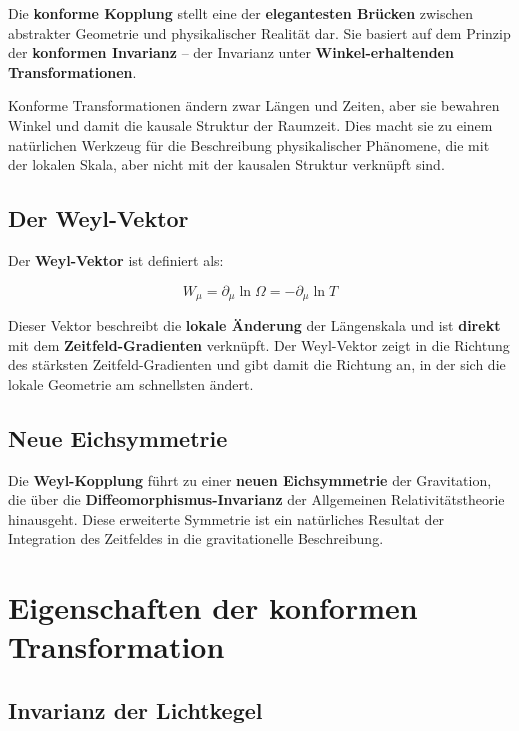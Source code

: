 \documentclass[12pt,a4paper]{report}
\begin{document}
	Die \textbf{konforme Kopplung} stellt eine der \textbf{elegantesten Brücken} zwischen abstrakter Geometrie und physikalischer Realität dar. Sie basiert auf dem Prinzip der \textbf{konformen Invarianz} -- der Invarianz unter \textbf{Winkel-erhaltenden Transformationen}.
	
	Konforme Transformationen ändern zwar Längen und Zeiten, aber sie bewahren Winkel und damit die kausale Struktur der Raumzeit. Dies macht sie zu einem natürlichen Werkzeug für die Beschreibung physikalischer Phänomene, die mit der lokalen Skala, aber nicht mit der kausalen Struktur verknüpft sind.
	
	\subsection{Der Weyl-Vektor}
	
	Der \textbf{Weyl-Vektor} ist definiert als:
	
	\begin{equation}
		W_\mu = \partial_\mu \ln \Omega = -\partial_\mu \ln T
	\end{equation}
	
	Dieser Vektor beschreibt die \textbf{lokale Änderung} der Längenskala und ist \textbf{direkt} mit dem \textbf{Zeitfeld-Gradienten} verknüpft. Der Weyl-Vektor zeigt in die Richtung des stärksten Zeitfeld-Gradienten und gibt damit die Richtung an, in der sich die lokale Geometrie am schnellsten ändert.
	
	\subsection{Neue Eichsymmetrie}
	
	Die \textbf{Weyl-Kopplung} führt zu einer \textbf{neuen Eichsymmetrie} der Gravitation, die über die \textbf{Diffeomorphismus-Invarianz} der Allgemeinen Relativitätstheorie hinausgeht. Diese erweiterte Symmetrie ist ein natürliches Resultat der Integration des Zeitfeldes in die gravitationelle Beschreibung.
	
	\section{Eigenschaften der konformen Transformation}
	
	\subsection{Invarianz der Lichtkegel}
	
\end{document}
